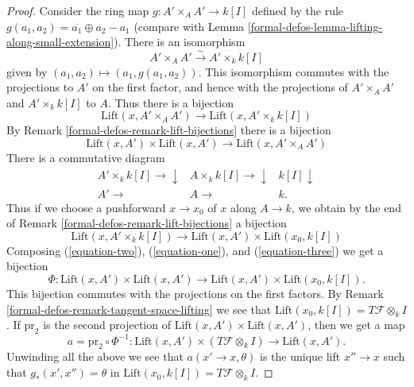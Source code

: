 \begin{proof}
Consider the ring map $g : A' \times_A A' \to k[I]$ defined by the
rule $g(a_1, a_2) = \overline{a_1} \oplus a_2 - a_1$ (compare with
Lemma \ref{formal-defos-lemma-lifting-along-small-extension}).
There is an isomorphism
$$
A' \times_A A' \xrightarrow{\sim} A' \times_k k[I]
$$
given by $(a_1, a_2) \mapsto (a_1, g(a_1, a_2))$.
This isomorphism commutes with the projections to $A'$ on the first
factor, and hence with the projections of
$A' \times_A A'$ and $A' \times_k k[I]$ to $A$. Thus there is a bijection
\begin{equation}
\label{equation-one}
\text{Lift}(x, A' \times_A A')
\longrightarrow
\text{Lift}(x, A' \times_k k[I])
\end{equation}
By Remark \ref{formal-defos-remark-lift-bijections} there is a bijection
\begin{equation}
\label{equation-two}
\text{Lift}(x, A') \times \text{Lift}(x, A')
\longrightarrow
\text{Lift}(x, A' \times_A A')
\end{equation}
There is a commutative diagram
$$
\begin{array}{ccc}A' \times_k k[I] \longrightarrow\downarrow & A \times_k k[I] \longrightarrow\downarrow & k[I] \downarrow \\ A' \longrightarrow & A \longrightarrow & k.\end{array}
$$
Thus if we choose a pushforward $x \to x_0$ of $x$ along
$A \to k$, we obtain by the end of
Remark \ref{formal-defos-remark-lift-bijections}
a bijection
\begin{equation}
\label{equation-three}
\text{Lift}(x, A' \times_k k[I])
\longrightarrow
\text{Lift}(x, A') \times \text{Lift}(x_0, k[I])
\end{equation}
Composing (\ref{equation-two}), (\ref{equation-one}), and
(\ref{equation-three})
we get a bijection
$$
\Phi :
\text{Lift}(x, A') \times \text{Lift}(x, A')
\longrightarrow
\text{Lift}(x, A') \times \text{Lift}(x_0, k[I]).
$$
This bijection commutes with the projections on the first factors.
By Remark \ref{formal-defos-remark-tangent-space-lifting}
we see that $\text{Lift}(x_0, k[I]) = T\mathcal{F} \otimes_k I$.
If $\text{pr}_2$ is the second projection of
$\text{Lift}(x, A') \times \text{Lift}(x, A')$, then we get a map
$$
a = \text{pr}_2 \circ \Phi^{-1} :
\text{Lift}(x, A') \times (T\mathcal{F} \otimes_k I)
\longrightarrow
\text{Lift}(x, A').
$$
Unwinding all the above we see that $a(x' \to x, \theta)$
is the unique lift $x'' \to x$ such that $g_*(x', x'') = \theta$
in $\text{Lift}(x_0, k[I]) = T\mathcal{F} \otimes_k I$.

\end{proof}
